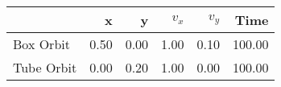 \begin{tabular}{lrrrrr}
\toprule
{} &    x &    y &  $v_x$ &  $v_y$ &   Time \\
\midrule
Box Orbit   & 0.50 & 0.00 &   1.00 &   0.10 & 100.00 \\
Tube Orbit  & 0.00 & 0.20 &   1.00 &   0.00 & 100.00 \\
\bottomrule
\end{tabular}
